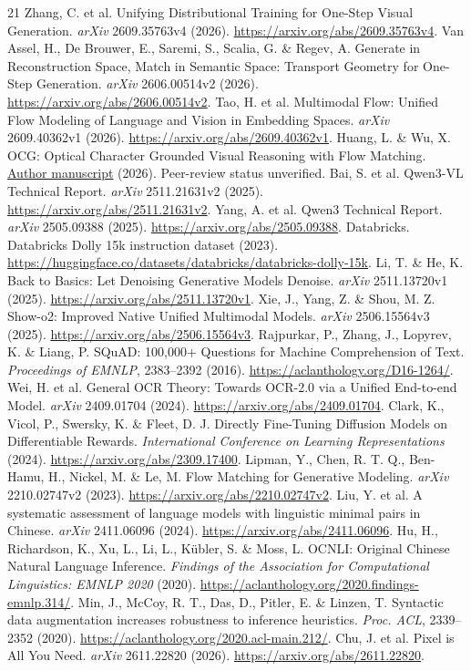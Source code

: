 \begin{thebibliography}{21}
 Zhang, C. et al. Unifying Distributional Training for One-Step Visual Generation. \emph{arXiv} 2609.35763v4 (2026). \url{https://arxiv.org/abs/2609.35763v4}.
 Van Assel, H., De Brouwer, E., Saremi, S., Scalia, G. \& Regev, A. Generate in Reconstruction Space, Match in Semantic Space: Transport Geometry for One-Step Generation. \emph{arXiv} 2606.00514v2 (2026). \url{https://arxiv.org/abs/2606.00514v2}.
 Tao, H. et al. Multimodal Flow: Unified Flow Modeling of Language and Vision in Embedding Spaces. \emph{arXiv} 2609.40362v1 (2026). \url{https://arxiv.org/abs/2609.40362v1}.
 Huang, L. \& Wu, X. OCG: Optical Character Grounded Visual Reasoning with Flow Matching. \href{https://www.alphaxiv.org/abs/2608.ocg-optical-character-grounded-reasoning}{Author manuscript} (2026). Peer-review status unverified.
 Bai, S. et al. Qwen3-VL Technical Report. \emph{arXiv} 2511.21631v2 (2025). \url{https://arxiv.org/abs/2511.21631v2}.
 Yang, A. et al. Qwen3 Technical Report. \emph{arXiv} 2505.09388 (2025). \url{https://arxiv.org/abs/2505.09388}.
 Databricks. Databricks Dolly 15k instruction dataset (2023). \url{https://huggingface.co/datasets/databricks/databricks-dolly-15k}.
 Li, T. \& He, K. Back to Basics: Let Denoising Generative Models Denoise. \emph{arXiv} 2511.13720v1 (2025). \url{https://arxiv.org/abs/2511.13720v1}.
 Xie, J., Yang, Z. \& Shou, M. Z. Show-o2: Improved Native Unified Multimodal Models. \emph{arXiv} 2506.15564v3 (2025). \url{https://arxiv.org/abs/2506.15564v3}.
 Rajpurkar, P., Zhang, J., Lopyrev, K. \& Liang, P. SQuAD: 100,000+ Questions for Machine Comprehension of Text. \emph{Proceedings of EMNLP}, 2383--2392 (2016). \url{https://aclanthology.org/D16-1264/}.
 Wei, H. et al. General OCR Theory: Towards OCR-2.0 via a Unified End-to-end Model. \emph{arXiv} 2409.01704 (2024). \url{https://arxiv.org/abs/2409.01704}.
 Clark, K., Vicol, P., Swersky, K. \& Fleet, D. J. Directly Fine-Tuning Diffusion Models on Differentiable Rewards. \emph{International Conference on Learning Representations} (2024). \url{https://arxiv.org/abs/2309.17400}.
 Lipman, Y., Chen, R. T. Q., Ben-Hamu, H., Nickel, M. \& Le, M. Flow Matching for Generative Modeling. \emph{arXiv} 2210.02747v2 (2023). \url{https://arxiv.org/abs/2210.02747v2}.
 Liu, Y. et al. A systematic assessment of language models with linguistic minimal pairs in Chinese. \emph{arXiv} 2411.06096 (2024). \url{https://arxiv.org/abs/2411.06096}.
 Hu, H., Richardson, K., Xu, L., Li, L., K\"ubler, S. \& Moss, L. OCNLI: Original Chinese Natural Language Inference. \emph{Findings of the Association for Computational Linguistics: EMNLP 2020} (2020). \url{https://aclanthology.org/2020.findings-emnlp.314/}.
 Min, J., McCoy, R. T., Das, D., Pitler, E. \& Linzen, T. Syntactic data augmentation increases robustness to inference heuristics. \emph{Proc. ACL}, 2339--2352 (2020). \url{https://aclanthology.org/2020.acl-main.212/}.
 Chu, J. et al. Pixel is All You Need. \emph{arXiv} 2611.22820 (2026). \url{https://arxiv.org/abs/2611.22820}.
\end{thebibliography}
